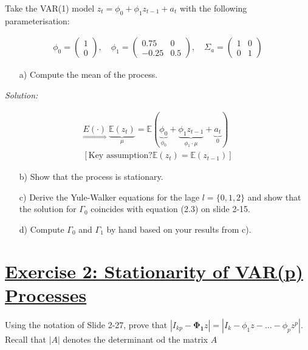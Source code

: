 \documentclass[12pt,a4paper]{article}
\newcommand{\tmpsection}[1]{}
\let\tmpsection=\section
\renewcommand{\section}[1]{\tmpsection{\underline{#1}} }
\begin{document}
Take the VAR(1) model \(z_t = \phi_0 + \phi_1 z_{t-1} + a_t\) with the
following parameterisation:

\begin{align*}
    \phi_0 = \begin{pmatrix} 1 \\ 0 \end{pmatrix}, \quad \phi_1 = \begin{pmatrix} 0.75 & 0 \\ -0.25 & 0.5 \end{pmatrix}, \quad \Sigma_a = \begin{pmatrix} 1 & 0 \\ 0 & 1 \end{pmatrix}
\end{align*}

\begin{itemize}
    \item[a)] Compute the mean of the process.
\end{itemize}

\emph{Solution:}

\begin{align*}
  \underset{\Rightarrow}{E(\cdot)} \; \underbrace{ \mathbb{E} (z_t)}_{\mu}  = \mathbb{E} \left(  \underbrace{\phi_0}_{\phi_0} + \underbrace{\phi_1 z_{t -1}}_{\phi_1 \cdot \mu}+ \underbrace{a_t}_{0}\right)\\
  \left[ \text{Key assumption?}  \mathbb{E} (z_t)  = \mathbb{E} (z_{t-1}) \right]
\end{align*}

\begin{itemize}
    \item[b)] Show that the process is stationary.
    \item[c)] Derive the Yule-Walker equations for the lage $l = \{0,1,2 \}$ and show that the solution for $\Gamma_0$ coincides with equation (2.3) on slide 2-15.
    \item[d)] Compute $\Gamma_0$ and $\Gamma_1$ by hand based on your results from c).
\end{itemize}

\hypertarget{exercise-2-stationarity-of-varp-processes}{%
\section{Exercise 2: Stationarity of VAR(p)
Processes}\label{exercise-2-stationarity-of-varp-processes}}

Using the notation of Slide 2-27, prove that
\(|I_{kp} - \pmb{\Phi_1} z| = |I_k - \phi_1 z - \ldots - \phi_p z^p|\).
Recall that \(|A|\) denotes the determinant od the matrix \(A\)
\end{document}
